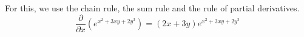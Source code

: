 For this, we use the chain rule, the sum rule and the rule of partial derivatives.
$$
\frac{\partial}{\partial x}(e^{x^2+3xy+2y^3}) = (2x+3y)e^{x^2+3xy+2y^3}
$$
